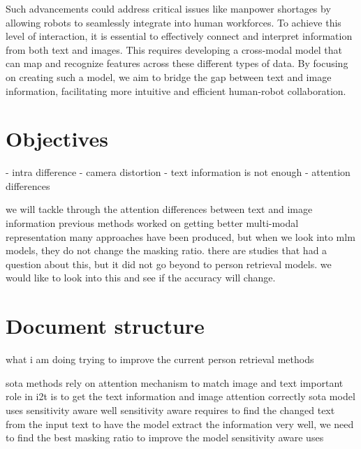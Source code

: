 Such advancements could address critical issues like manpower shortages by allowing robots to seamlessly integrate into human workforces. To achieve this level of interaction, it is essential to effectively connect and interpret information from both text and images. This requires developing a cross-modal model that can map and recognize features across these different types of data. By focusing on creating such a model, we aim to bridge the gap between text and image information, facilitating more intuitive and efficient human-robot collaboration.

\section{Objectives}
- intra difference
- camera distortion
- text information is not enough
- attention differences

we will tackle through the attention differences between text and image information
previous methods worked on getting better multi-modal representation 
many approaches have been produced, but when we look into mlm models, they do not change the masking ratio. there are studies that had a question about this, but it did not go beyond to person retrieval models. we would like to look into this and see if the accuracy will change.

\section{Document structure}

what i am doing 
trying to improve the current person retrieval methods

sota methods rely on attention mechanism to match image and text 
important role in i2t is to get the text information and image attention correctly 
sota model uses sensitivity aware well 
sensitivity aware requires to find the changed text from the input text 
to have the model extract the information very well, we need to find the best masking ratio to improve the model
sensitivity aware uses 
